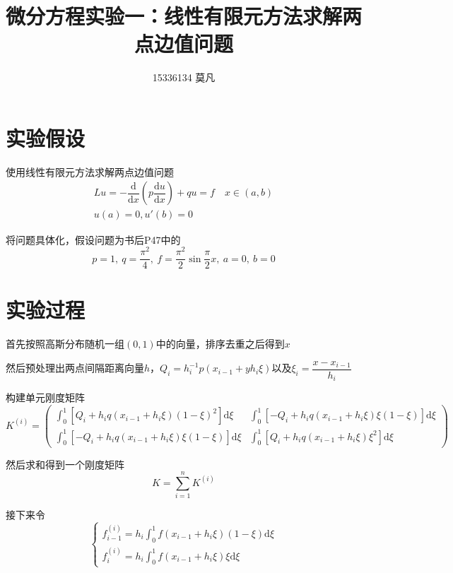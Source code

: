 \documentclass[11pt, a4paper]{article}
\begin{document}
	
\title{微分方程实验一：线性有限元方法求解两点边值问题}
\author{15336134 莫凡}
\maketitle

\section{实验假设}

使用线性有限元方法求解两点边值问题
\begin{equation}
\begin{array}{c}
Lu=-\dfrac{\mathrm{d}}{\mathrm{d}x}\left(p\dfrac{\mathrm{d}u}{\mathrm{d}x}\right)+qu=f\quad x\in (a, b)\\
u(a)=0,u'(b)=0
\end{array}
\end{equation}

将问题具体化，假设问题为书后P47中的
\begin{equation}
p=1,~q=\dfrac{\pi^2}{4},~f=\dfrac{\pi^2}{2}\sin\dfrac{\pi}{2}x,~a=0,~b=0
\end{equation}

\section{实验过程}
首先按照高斯分布随机一组$(0,1)$中的向量，排序去重之后得到$x$

然后预处理出两点间隔距离向量$h$，$Q_i=h_i^{-1}p(x_{i-1}+yh_i\xi)$以及$\xi_i=\dfrac{x-x_{i-1}}{h_i}$

构建单元刚度矩阵
\begin{equation}
K^{(i)}=
\begin{pmatrix}
\int_{0}^{1}[Q_i+h_iq(x_{i-1}+h_i\xi)(1-\xi)^2]\mathrm{d}\xi &
\int_{0}^{1}[-Q_i+h_iq(x_{i-1}+h_i\xi)\xi(1-\xi)]\mathrm{d}\xi \\
\int_{0}^{1}[-Q_i+h_iq(x_{i-1}+h_i\xi)\xi(1-\xi)]\mathrm{d}\xi &
\int_{0}^{1}[Q_i+h_iq(x_{i-1}+h_i\xi)\xi^2]\mathrm{d}\xi 
\end{pmatrix}
\end{equation}

然后求和得到一个刚度矩阵
\begin{equation}
K=\sum_{i=1}^nK^{(i)}
\end{equation}

接下来令
\begin{equation}
\left\{
\begin{array}{l}
f_{i-1}^{(i)}=h_i\int_0^1f(x_{i-1}+h_i\xi)(1-\xi)\mathrm{d}\xi\\
f_{i}^{(i)}=h_i\int_0^1f(x_{i-1}+h_i\xi)\xi\mathrm{d}\xi
\end{array}
\right.
\end{equation}
\end{document}
